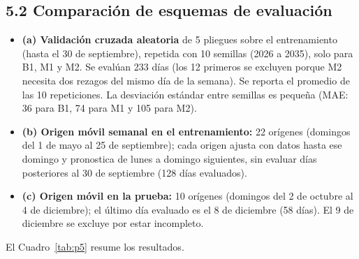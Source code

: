 \documentclass[11pt]{article}
\begin{document}
\subsection*{5.2 Comparación de esquemas de evaluación}
\begin{itemize}
  \item \textbf{(a) Validación cruzada aleatoria} de 5 pliegues sobre el entrenamiento (hasta el 30 de septiembre), repetida con 10 semillas (2026 a 2035), solo para B1, M1 y M2. Se evalúan 233 días (los 12 primeros se excluyen porque M2 necesita dos rezagos del mismo día de la semana). Se reporta el promedio de las 10 repeticiones. La desviación estándar entre semillas es pequeña (MAE: 36 para B1, 74 para M1 y 105 para M2).
  \item \textbf{(b) Origen móvil semanal en el entrenamiento:} 22 orígenes (domingos del 1 de mayo al 25 de septiembre); cada origen ajusta con datos hasta ese domingo y pronostica de lunes a domingo siguientes, sin evaluar días posteriores al 30 de septiembre (128 días evaluados).
  \item \textbf{(c) Origen móvil en la prueba:} 10 orígenes (domingos del 2 de octubre al 4 de diciembre); el último día evaluado es el 8 de diciembre (58 días). El 9 de diciembre se excluye por estar incompleto.
\end{itemize}

El Cuadro~\ref{tab:p5} resume los resultados.

\begin{table}[H]
\centering
{}
\caption{Errores de pronóstico diario (\pounds{}) por modelo y esquema de evaluación. En (a) se reporta la media $\pm$ la desviación estándar entre las 10 semillas.}
\label{tab:p5}
\end{table}
\end{document}
